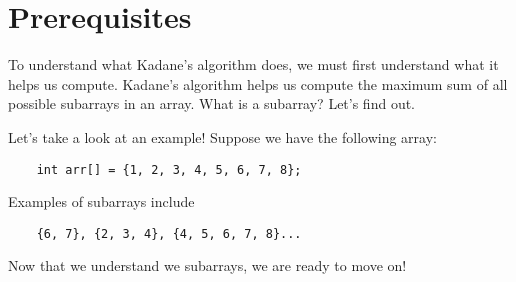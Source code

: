 
\section{Prerequisites}

To understand what Kadane's algorithm does, we must first understand what it helps us compute. Kadane's algorithm helps us compute the maximum sum of all possible subarrays in an array. What is a subarray? Let's find out. 

\noindent \newline {}

\noindent \newline Let's take a look at an example! Suppose we have the following array:
\begin{verbatim} 
    int arr[] = {1, 2, 3, 4, 5, 6, 7, 8};
\end{verbatim}

\noindent Examples of subarrays include 
\begin{verbatim} 
    {6, 7}, {2, 3, 4}, {4, 5, 6, 7, 8}...
\end{verbatim}

\noindent Now that we understand we subarrays, we are ready to move on!
